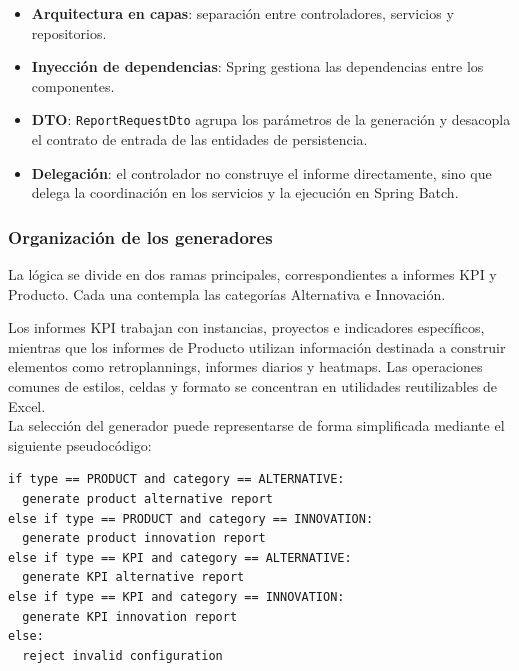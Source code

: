 \documentclass[11pt,a4paper,titlepage,oneside]{report}
\begin{document}
\begin{itemize}

  \item \textbf{Arquitectura en capas}: separación entre controladores,
  servicios y repositorios.

  \item \textbf{Inyección de dependencias}: Spring gestiona las dependencias
  entre los componentes.

  \item \textbf{DTO}: \texttt{ReportRequestDto} agrupa los parámetros de la
  generación y desacopla el contrato de entrada de las entidades de
  persistencia.

  \item \textbf{Delegación}: el controlador no construye el informe
  directamente, sino que delega la coordinación en los servicios y la
  ejecución en Spring Batch.

\end{itemize}

\subsubsection{Organización de los generadores}

La lógica se divide en dos ramas principales, correspondientes a informes KPI y
Producto. Cada una contempla las categorías Alternativa e Innovación.

Los informes KPI trabajan con instancias, proyectos e indicadores específicos,
mientras que los informes de Producto utilizan información destinada a
construir elementos como retroplannings, informes diarios y heatmaps. Las
operaciones comunes de estilos, celdas y formato se concentran en utilidades
reutilizables de Excel.\\

La selección del generador puede representarse de forma simplificada mediante
el siguiente pseudocódigo:

\begin{lstlisting}[caption={Selección del generador según los parámetros del informe}]
if type == PRODUCT and category == ALTERNATIVE:
  generate product alternative report
else if type == PRODUCT and category == INNOVATION:
  generate product innovation report
else if type == KPI and category == ALTERNATIVE:
  generate KPI alternative report
else if type == KPI and category == INNOVATION:
  generate KPI innovation report
else:
  reject invalid configuration
\end{lstlisting}
\end{document}
